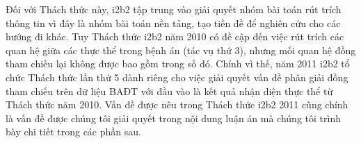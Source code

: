 Đối với Thách thức này, i2b2 tập trung vào giải quyết nhóm bài toán rút trích thông tin vì đây là nhóm bài toán nền tảng, tạo tiền đề để nghiên cứu cho các hướng đi khác. Tuy Thách thức i2b2 năm 2010 có đề cập đến việc rút trích các quan hệ giữa các thực thể trong bệnh án (tác vụ thứ 3), nhưng mối quan hệ đồng tham chiếu lại không được bao gồm trong số đó. Chính vì thế, năm 2011 i2b2 tổ chức Thách thức lần thứ 5 dành riêng cho việc giải quyết vấn đề phân giải đồng tham chiếu trên dữ liệu BAĐT với đầu vào là kết quả nhận diện thực thể từ Thách thức năm 2010. Vấn đề được nêu trong Thách thức i2b2 2011 cũng chính là vấn đề được chúng tôi giải quyết trong nội dung luận án mà chúng tôi trình bày chi tiết trong các phần sau.